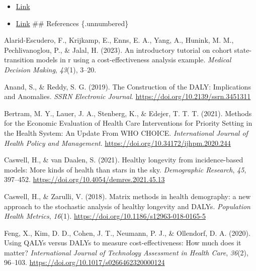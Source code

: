\documentclass[
]{agujournal2019}
\providecommand{\tightlist}{%
  \setlength{\itemsep}{0pt}\setlength{\parskip}{0pt}}\usepackage{longtable,booktabs,array}
\newlength{\cslhangindent}
\newenvironment{CSLReferences}[2] %
 {\begin{list}{}{%
  \setlength{\itemindent}{0pt}
  \setlength{\leftmargin}{0pt}
  \setlength{\parsep}{0pt}
  \ifodd #1
   \setlength{\leftmargin}{\cslhangindent}
   \setlength{\itemindent}{-1\cslhangindent}
  \fi
  \setlength{\itemsep}{#2\baselineskip}}}
 {\end{list}}
\begin{document}
\begin{itemize}
\tightlist
\item
  \href{https://academic.oup.com/heapol/article/21/5/402/578296?login=false}{Link}
\item
  \href{https://link.springer.com/article/10.1007/s40258-022-00722-3}{Link}
  \#\# References \{.unnumbered\}
\end{itemize}

\label{refs}
\begin{CSLReferences}{1}{0}
\vspace{1em}

Alarid-Escudero, F., Krijkamp, E., Enns, E. A., Yang, A., Hunink, M. M.,
Pechlivanoglou, P., \& Jalal, H. (2023). An introductory tutorial on
cohort state-transition models in r using a cost-effectiveness analysis
example. \emph{Medical Decision Making}, \emph{43}(1), 3--20.

Anand, S., \& Reddy, S. G. (2019). The Construction of the DALY:
Implications and Anomalies. \emph{SSRN Electronic Journal}.
\url{https://doi.org/10.2139/ssrn.3451311}

Bertram, M. Y., Lauer, J. A., Stenberg, K., \& Edejer, T. T. T. (2021).
Methods for the Economic Evaluation of Health Care Interventions for
Priority Setting in the Health System: An Update From WHO CHOICE.
\emph{International Journal of Health Policy and Management}.
\url{https://doi.org/10.34172/ijhpm.2020.244}

Caswell, H., \& van Daalen, S. (2021). Healthy longevity from
incidence-based models: More kinds of health than stars in the sky.
\emph{Demographic Research}, \emph{45}, 397--452.
\url{https://doi.org/10.4054/demres.2021.45.13}

Caswell, H., \& Zarulli, V. (2018). Matrix methods in health demography:
a new approach to the stochastic analysis of healthy longevity and
DALYs. \emph{Population Health Metrics}, \emph{16}(1).
\url{https://doi.org/10.1186/s12963-018-0165-5}

Feng, X., Kim, D. D., Cohen, J. T., Neumann, P. J., \& Ollendorf, D. A.
(2020). Using QALYs versus DALYs to measure cost-effectiveness: How much
does it matter? \emph{International Journal of Technology Assessment in
Health Care}, \emph{36}(2), 96--103.
\url{https://doi.org/10.1017/s0266462320000124}


\end{CSLReferences}
\end{document}
